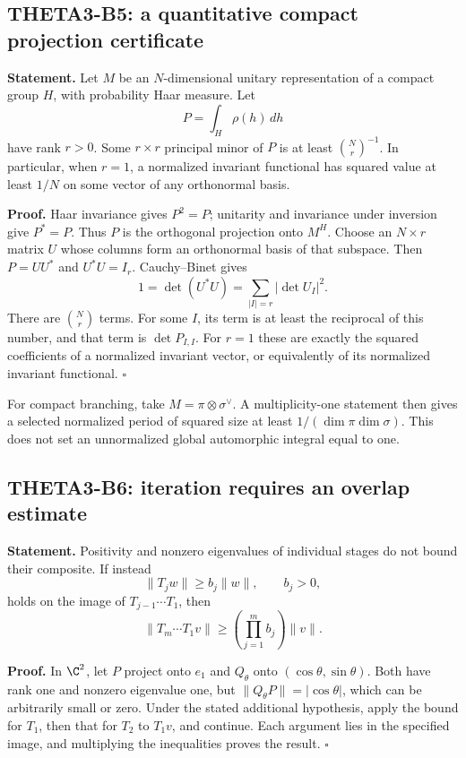 \documentclass[11pt]{article}
\theoremstyle{definition}\newtheorem{definition}[theorem]{Definition}\newtheorem{remark}[theorem]{Remark}
\begin{document}
\subsection{THETA3-B5: a quantitative compact projection certificate}\label{B5}

\textbf{Statement.} Let $M$ be an $N$-dimensional unitary representation of a compact group $H$, with probability Haar measure. Let
\[
 P=\int_H\rho(h)\,dh
\]
have rank $r>0$. Some $r\times r$ principal minor of $P$ is at least $\binom Nr^{-1}$. In particular, when $r=1$, a normalized invariant functional has squared value at least $1/N$ on some vector of any orthonormal basis.

\textbf{Proof.} Haar invariance gives $P^2=P$; unitarity and invariance under inversion give $P^*=P$. Thus $P$ is the orthogonal projection onto $M^H$. Choose an $N\times r$ matrix $U$ whose columns form an orthonormal basis of that subspace. Then $P=UU^*$ and $U^*U=I_r$. Cauchy--Binet gives
\[
 1=\det(U^*U)=\sum_{|I|=r}|\det U_I|^2.
\]
There are $\binom Nr$ terms. For some $I$, its term is at least the reciprocal of this number, and that term is $\det P_{I,I}$. For $r=1$ these are exactly the squared coefficients of a normalized invariant vector, or equivalently of its normalized invariant functional. \hfill$\square$

For compact branching, take $M=\pi\otimes\sigma^\vee$. A multiplicity-one statement then gives a selected normalized period of squared size at least $1/(\dim\pi\dim\sigma)$. This does not set an unnormalized global automorphic integral equal to one.

\subsection{THETA3-B6: iteration requires an overlap estimate}\label{B6}

\textbf{Statement.} Positivity and nonzero eigenvalues of individual stages do not bound their composite. If instead
\[
 \|T_jw\|\geq b_j\|w\|,\qquad b_j>0,
\]
holds on the image of $T_{j-1}\cdots T_1$, then
\[
 \|T_m\cdots T_1v\|\geq\left(\prod_{j=1}^m b_j\right)\|v\|.
\]

\textbf{Proof.} In $\C^2$, let $P$ project onto $e_1$ and $Q_\theta$ onto $(\cos\theta,\sin\theta)$. Both have rank one and nonzero eigenvalue one, but $\|Q_\theta P\|=|\cos\theta|$, which can be arbitrarily small or zero. Under the stated additional hypothesis, apply the bound for $T_1$, then that for $T_2$ to $T_1v$, and continue. Each argument lies in the specified image, and multiplying the inequalities proves the result. \hfill$\square$
\end{document}
